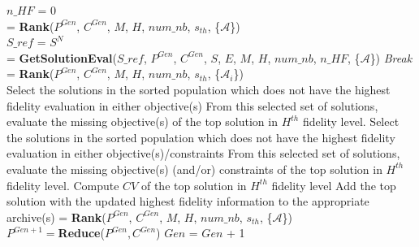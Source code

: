 \begin{minipage}[0.7\textheight]{0.95\columnwidth}
\begin{spacing}{0.7}
\begin{algorithm}[H]
\begin{algorithmic}[1]
				\STATE $n\_HF$ = $0$ \qquad {} \\
				\STATE [$S$,$E$] = \textbf{Rank}($P^{Gen}$, $C^{Gen}$, $M$, $H$, $num\_nb$, $s_{th}$, \{$\mathcal{A}$\})\qquad {} \\
				\STATE $S\_ref$ = $S^N$ \qquad {}\\
				 = \textbf{GetSolutionEval}($S\_ref$, $P^{Gen}$, $C^{Gen}$, $S$, $E$, $M$, $H$, $num\_nb$, $n\_HF$, \{$\mathcal{A}$\})
				\STATE \textit{Break}
				\ENDIF
				\ENDFOR
				\STATE [$S$,$E$] = \textbf{Rank}($P^{Gen}$, $C^{Gen}$, $M$, $H$, $num\_nb$, $s_{th}$, \{$\mathcal{A}_i$\})\qquad {} \\
				\STATE Select the solutions in the sorted population which does not have the highest fidelity evaluation in either objective(s)
				\STATE From this selected set of solutions, evaluate the missing objective(s) of the top solution in $H^{th}$ fidelity level.
				\ELSE
				\STATE Select the solutions in the sorted population which does not have the highest fidelity evaluation in either objective(s)/constraints
				\STATE From this selected set of solutions, evaluate the missing objective(s) (and/or) constraints of the top solution in $H^{th}$ fidelity level.
				\STATE Compute $CV$ of the top solution in $H^{th}$ fidelity level
				\ENDIF
				\STATE Add the top solution with the updated highest fidelity information to the appropriate archive(s)
				\ENDIF
				\STATE [$S$,$E$] = \textbf{Rank}($P^{Gen}$, $C^{Gen}$, $M$, $H$, $num\_nb$, $s_{th}$, \{$\mathcal{A}$\})\qquad {} \\
				\STATE $P^{Gen+1} = $\textbf{Reduce}($P^{Gen},C^{Gen}$)
				\STATE $Gen$ = $Gen$ + 1
				\ENDWHILE
			\end{algorithmic}
			\label{alg:MFEA}
		\end{algorithm}
	\end{spacing}
\end{minipage} 


